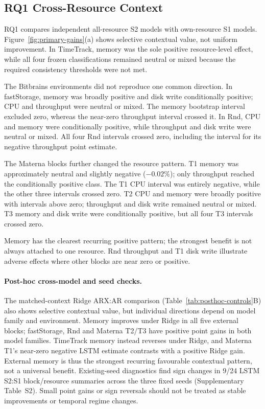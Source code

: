 \documentclass[a4paper,fleqn]{cas-dc}
\begin{document}
\subsection{RQ1 Cross-Resource Context}
\label{sec:results-rq1}

RQ1 compares independent all-resource S2 models with own-resource S1
models. Figure~\ref{fig:primary-gains}(a) shows selective
contextual value, not uniform improvement. In TimeTrack, memory was the sole
positive resource-level effect, while all four frozen classifications remained
neutral or mixed because the required consistency thresholds were not met.

The Bitbrains environments did not reproduce one common direction. In
fastStorage, memory was broadly positive and disk write conditionally positive;
CPU and throughput were neutral or mixed. The memory bootstrap interval
excluded zero, whereas the near-zero throughput interval crossed it. In Rnd,
CPU and memory were conditionally positive, while throughput and disk write
were neutral or mixed. All four Rnd intervals crossed zero, including the
interval for its negative throughput point estimate.

The Materna blocks further changed the resource pattern. T1 memory was
approximately neutral and slightly negative ($-0.02\%$); only throughput
reached the conditionally positive class. The T1 CPU interval was entirely
negative, while the other three intervals crossed zero. T2 CPU and memory
were broadly positive with intervals above zero; throughput and disk write
remained neutral or mixed. T3 memory and disk write were conditionally
positive, but all four T3 intervals crossed zero.

Memory has the clearest recurring positive pattern; the strongest benefit is
not always attached to one resource. Rnd throughput and T1 disk write illustrate
adverse effects where other blocks are near zero or positive.

\paragraph{Post-hoc cross-model and seed checks.}
The matched-context Ridge ARX:AR comparison
(Table~\ref{tab:posthoc-controls}B) also shows selective contextual value,
but individual directions depend on model family and environment. Memory
improves under Ridge in all five external blocks; fastStorage, Rnd and
Materna T2/T3 have positive point gains in both model families. TimeTrack
memory instead reverses under Ridge, and Materna T1's near-zero negative
LSTM estimate contrasts with a positive Ridge gain. External memory is thus
the strongest recurring favourable contextual pattern, not a universal
benefit. Existing-seed diagnostics find sign changes in 9/24 LSTM S2:S1
block/resource summaries across the three fixed seeds (Supplementary
Table~S2). Small point gains or
sign reversals should not be treated as stable improvements or temporal
regime changes.
\end{document}

